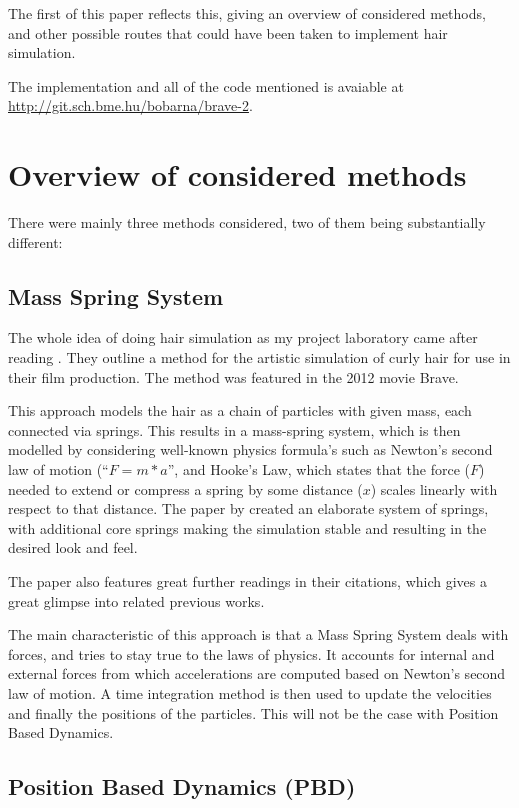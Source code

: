 \documentclass[sigplan,screen,nonacm]{acmart}
\begin{document}
The first of this paper reflects this, giving an overview of considered methods,
and other possible routes that could have been taken to implement hair
simulation.


The implementation and all of the code mentioned is avaiable at
\url{http://git.sch.bme.hu/bobarna/brave-2}.

\section{Overview of considered methods}

There were mainly three methods considered, two of them being substantially
different:


\subsection{Mass Spring System}
The whole idea of doing hair simulation as my project laboratory came after
reading \citet{PixarPaper}. They outline a method for the artistic simulation of
curly hair for use in their film production. The method was featured in the 2012
movie Brave.

This approach models the hair as a chain of particles with given mass, each
connected via springs. This results in a mass-spring system, which is then
modelled by considering well-known physics formula's such as Newton's second law
of motion (``$F=m*a$'', and Hooke's Law, which states that the force ($F$)
needed to extend or compress a spring by some distance ($x$) scales linearly with
respect to that distance. The paper by \citet{PixarPaper} created an elaborate
system of springs, with additional core springs making the simulation stable
and resulting in the desired look and feel.

The \citet{PixarPaper} paper also features great further readings in their
citations, which gives a great glimpse into related previous works.

The main characteristic of this approach is that a Mass Spring System deals with
forces, and tries to stay true to the laws of physics. It accounts for internal 
and external forces from which accelerations are computed based on Newton's 
second law of motion. A time integration method is then used to update the
velocities and finally the positions of the particles. This will not be the case
with Position Based Dynamics.

\subsection{Position Based Dynamics (PBD)}
\end{document}
